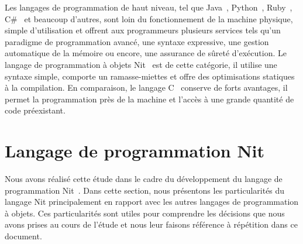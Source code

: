 
\begin{introduction}
\label{introduction}

Les langages de programmation de haut niveau, tel que Java~\cite{java}, Python~\cite{pythonRef}, Ruby~\cite{rubyCookbook}, C\#~\cite{csharp} et beaucoup d'autres, sont loin du fonctionnement de la machine physique, simple d'utilisation et offrent aux programmeurs plusieurs services tels qu'un paradigme de programmation avancé, une syntaxe expressive, une gestion automatique de la mémoire ou encore, une assurance de sûreté d'exécution. Le langage de programmation à objets Nit~\cite{nit} est de cette catégorie, il utilise une syntaxe simple, comporte un ramasse-miettes et offre des optimisations statiques à la compilation. En comparaison, le langage C~\cite{ansi-c89} conserve de forts avantages, il permet la programmation près de la machine et l'accès à une grande quantité de code préexistant. 

\section{Langage de programmation Nit}

Nous avons réalisé cette étude dans le cadre du développement du langage de programmation Nit~\cite{nit}. Dans cette section, nous présentons les particularités du langage Nit principalement en rapport avec les autres langages de programmation à objets. Ces particularités sont utiles pour comprendre les décisions que nous avons prises au cours de l'étude et nous leur faisons référence à répétition dans ce document.

\end{introduction}
